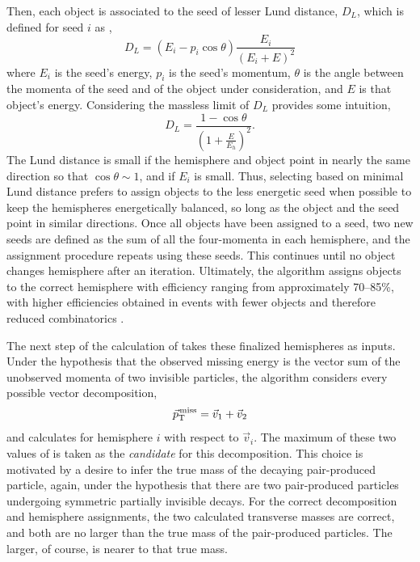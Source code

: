     Then, each object is associated to the seed of lesser Lund distance, $D_{L}$, which is defined for seed $i$ as \cite{lund1,lund2},
    \begin{equation} \label{eqn:lund}
      D_L = (E_{i}-p_{i}\cos\theta)\frac{E_{i}}{(E_{i}+E)^2}
    \end{equation}
    where $E_i$ is the seed's energy, $p_i$ is the seed's momentum, $\theta$ is the angle between the momenta of the seed and of the object under consideration, and $E$ is that object's energy.
    Considering the massless limit of $D_L$ provides some intuition,
    \begin{equation} \label{eqn:lund}
      D_L = \frac{1-\cos\theta}{(1+\frac{E}{E_h})^2}.
    \end{equation}
    The Lund distance is small if the hemisphere and object point in nearly the same direction so that $\cos\theta\sim1$, and if $E_i$ is small.
    Thus, selecting based on minimal Lund distance prefers to assign objects to the less energetic seed when possible to keep the hemispheres energetically balanced, so long as the object and the seed point in similar directions.
    Once all objects have been assigned to a seed, two new seeds are defined as the sum of all the four-momenta in each hemisphere, and the assignment procedure repeats using these seeds.
    This continues until no object changes hemisphere after an iteration.
    Ultimately, the algorithm assigns objects to the correct hemisphere with efficiency ranging from approximately 70--85\%, with higher efficiencies obtained in events with fewer objects and therefore reduced combinatorics \cite{lundeff}.

    The next step of the calculation of \mttwo takes these finalized hemispheres as inputs.
    Under the hypothesis that the observed missing energy is the vector sum of the unobserved momenta of two invisible particles, the algorithm considers every possible vector decomposition,
    \begin{equation}
      {\vec p}_{\mathrm{T}}^{\kern1pt\text{miss}} = \vec{v}_1+\vec{v}_2
    \end{equation}
    and calculates \Mt for hemisphere $i$ with respect to $\vec{v}_i$.
    The maximum of these two values of \Mt is taken as the {\it candidate} \mttwo for this decomposition.
    This choice is motivated by a desire to infer the true mass of the decaying pair-produced particle, again, under the hypothesis that there are two pair-produced particles undergoing symmetric partially invisible decays.
    For the correct \ptvecmiss decomposition and hemisphere assignments, the two calculated transverse masses are correct, and both are no larger than the true mass of the pair-produced particles. 
    The larger, of course, is nearer to that true mass.
    

